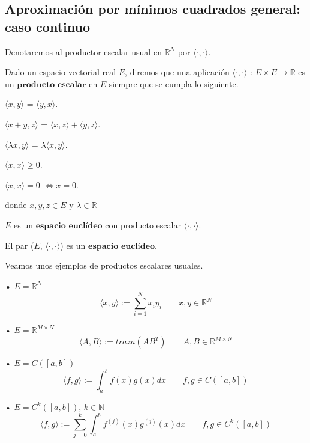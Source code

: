 \subsection{Aproximación por mínimos cuadrados general: caso continuo}
Denotaremos al productor escalar usual en $\mathbb{R}^N$ por $\langle \cdot , \cdot \rangle$.

\begin{ndef}
Dado un espacio vectorial real $E$, diremos que una aplicación $\langle \cdot , \cdot \rangle$ : $E \times E \longrightarrow \mathbb{R}$ es un $\textbf{producto escalar}$ en $E$ siempre que se cumpla lo siguiente.
	\begin{nlist}
	\item $\langle x,y \rangle$ = $\langle y,x \rangle$.
	\item $\langle x+y,z \rangle$ = $\langle x,z \rangle + \langle y,z \rangle$.
	\item $\langle \lambda x,y \rangle$ = $\lambda \langle x,y \rangle$.
	\item $\langle x,x \rangle \geq 0$.
	
	$\langle x,x \rangle = 0$ $\Leftrightarrow x = 0$.
	\end{nlist}
donde $x,y,z \in E$ y $\lambda \in \mathbb{R}$
\end{ndef}

\begin{ndef}
$E$ es un $\textbf{espacio euclídeo}$ con producto escalar $\langle \cdot , \cdot \rangle$.

El par ($E$, $\langle \cdot , \cdot \rangle$) es un $\textbf{espacio euclídeo}$.
\end{ndef}

\begin{ejemplo}
Veamos unos ejemplos de productos escalares usuales.
	\begin{nlist}
	\item[•] $E = \mathbb{R}^N$
	\[ \langle x,y \rangle := \sum_{i=1}^N x_iy_i \qquad x,y \in \mathbb{R}^N \]
	\item[•] $E = \mathbb{R}^{M \times N}$
	\[ \langle A,B \rangle := traza(AB^T) \qquad A,B \in \mathbb{R}^{M \times N} \]
	\item[•] $E = C([a,b])$
	\[ \langle f,g \rangle := \int_a^b f(x)g(x)dx \qquad f,g \in C([a,b]) \]
	\item[•] $E = C^k([a,b])$, $k \in \mathbb{N}$
	\[ \langle f,g \rangle := \sum_{j=0}^k \int_a^b f^{(j)}(x)g^{(j)}(x)dx \qquad f,g \in C^k([a,b]) \]
	\end{nlist}
\end{ejemplo}

